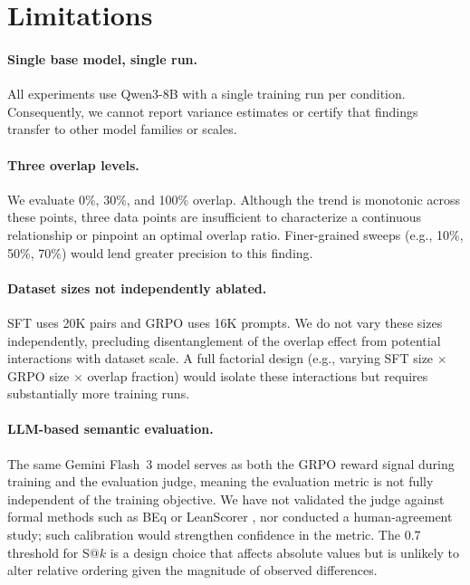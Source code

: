 \documentclass[11pt,a4paper]{article}
\begin{document}
\section{Limitations}\label{sec:limitations}

\paragraph{Single base model, single run.} All experiments use Qwen3-8B with a single training run per condition. Consequently, we cannot report variance estimates or certify that findings transfer to other model families or scales.

\paragraph{Three overlap levels.} We evaluate 0\%, 30\%, and 100\% overlap. Although the trend is monotonic across these points, three data points are insufficient to characterize a continuous relationship or pinpoint an optimal overlap ratio. Finer-grained sweeps (e.g., 10\%, 50\%, 70\%) would lend greater precision to this finding.

\paragraph{Dataset sizes not independently ablated.} SFT uses 20K pairs and GRPO uses 16K prompts. We do not vary these sizes independently, precluding disentanglement of the overlap effect from potential interactions with dataset scale. A full factorial design (e.g., varying SFT size $\times$ GRPO size $\times$ overlap fraction) would isolate these interactions but requires substantially more training runs.

\paragraph{LLM-based semantic evaluation.} The same Gemini Flash~3 model serves as both the GRPO reward signal during training and the evaluation judge, meaning the evaluation metric is not fully independent of the training objective. We have not validated the judge against formal methods such as BEq \citep{wu2025stepfun} or LeanScorer \citep{zhang2025mathesis}, nor conducted a human-agreement study; such calibration would strengthen confidence in the metric. The 0.7 threshold for S@$k$ is a design choice that affects absolute values but is unlikely to alter relative ordering given the magnitude of observed differences.
\end{document}
